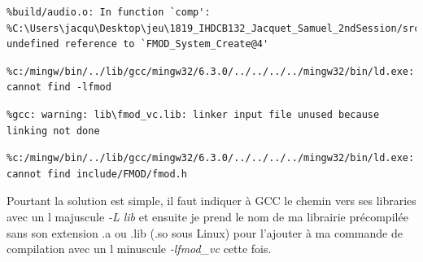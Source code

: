 \documentclass[12pt]{article}
\begin{document}

\begin{lstlisting}
%build/audio.o: In function `comp':
%C:\Users\jacqu\Desktop\jeu\1819_IHDCB132_Jacquet_Samuel_2ndSession/src/audio.c:25: undefined reference to `FMOD_System_Create@4'
\end{lstlisting}
\begin{lstlisting}
%c:/mingw/bin/../lib/gcc/mingw32/6.3.0/../../../../mingw32/bin/ld.exe: cannot find -lfmod
\end{lstlisting}
\begin{lstlisting}
%gcc: warning: lib\fmod_vc.lib: linker input file unused because linking not done
\end{lstlisting}
\begin{lstlisting}
%c:/mingw/bin/../lib/gcc/mingw32/6.3.0/../../../../mingw32/bin/ld.exe: cannot find include/FMOD/fmod.h
\end{lstlisting}

Pourtant la solution est simple, il faut indiquer à GCC le chemin vers ses libraries avec un l majuscule \emph{-L lib} et ensuite je prend le nom de ma librairie précompilée sans son extension .a ou .lib (.so sous Linux) pour l'ajouter à ma commande de compilation avec un l minuscule \emph{-lfmod\_vc} cette fois.\\
\newpage
\end{document}
